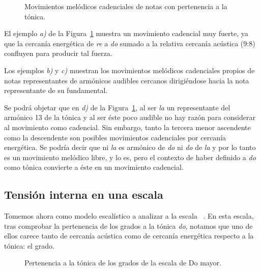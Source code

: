 \documentclass[a4paper,10pt]{article}
\begin{document}
\begin{figure}[ht]
\centering
{}
\caption{Movimientos melódicos cadenciales de notas con pertenencia a la tónica.}\label{fig:mov-cad}
\end{figure}

\begin{multicols}{2}
  El ejemplo \emph{a)} de la Figura~\ref{fig:mov-cad} muestra un movimiento cadencial muy fuerte, ya que la cercanía energética de \emph{re} a \emph{do} sumado a la relativa cercanía acústica (9:8) confluyen para producir tal fuerza.

  Los ejemplos \emph{b)} y \emph{c)} muestran los movimientos melódicos cadenciales propios de notas representantes de armónicos audibles cercanos dirigiéndose hacia la nota representante de su fundamental.

  Se podrá objetar que en \emph{d)} de la Figura~\ref{fig:mov-cad}, al ser \emph{la} un representante del armónico 13 de la tónica y al ser éste poco audible no hay razón para considerar al movimiento  como cadencial. Sin embargo, tanto la tercera menor ascendente como la descendente son posibles movimientos cadenciales por cercanía energética. Se podría decir que ni \emph{la} es armónico de \emph{do} ni \emph{do} de \emph{la} y por lo tanto es un movimiento melódico libre, y lo es, pero el contexto de haber definido a \emph{do} como tónica convierte a éste en un movimiento cadencial.

    \subsection{Tensión interna en una escala}\label{subsec:tension}

    Tomemos ahora como modelo escalístico a analizar a la escala \hbox{ .} En esta escala, tras comprobar la pertenencia de los grados a la tónica \emph{do}, notamos que uno de ellos carece tanto de cercanía acústica como de cercanía energética respecto a la tónica: el  grado.
\end{multicols}

\begin{figure}[ht]
\centering
{}
\caption{Pertenencia a la tónica de los grados de la escala de Do mayor. }\label{fig:pertenencia-do}
\end{figure}
\end{document}

